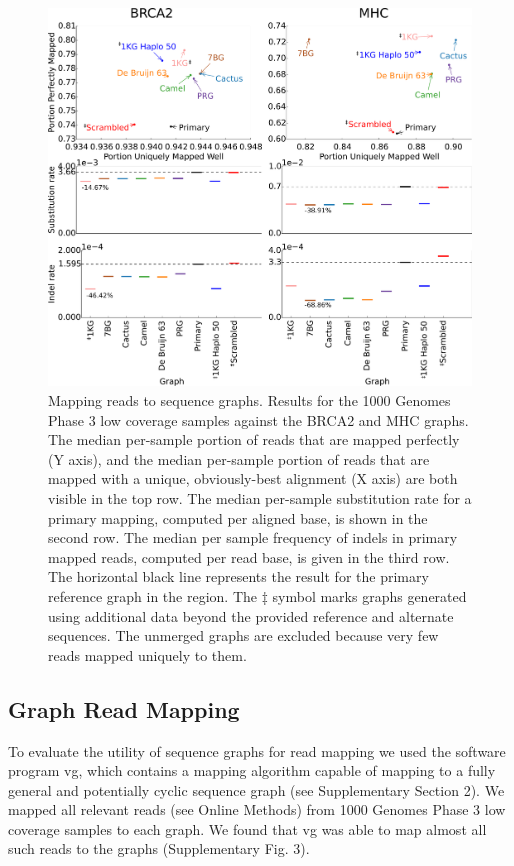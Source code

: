 \begin{figure}[htbp]
\centering
\includegraphics[width=\textwidth]{figures/04_bakeoff/figure02.png}
\caption[Mapping reads to sequence graphs]{Mapping reads to sequence graphs. Results for the 1000 Genomes
Phase 3 low coverage samples against the BRCA2 and MHC graphs. The
median per-sample portion of reads that are mapped perfectly (Y axis),
and the median per-sample portion of reads that are mapped with a
unique, obviously-best alignment (X axis) are both visible in the top
row. The median per-sample substitution rate for a primary mapping,
computed per aligned base, is shown in the second row. The median per
sample frequency of indels in primary mapped reads, computed per read
base, is given in the third row. The horizontal black line represents
the result for the primary reference graph in the region. The ‡ symbol
marks graphs generated using additional data beyond the provided
reference and alternate sequences. The unmerged graphs are excluded
because very few reads mapped uniquely to them.}
\label{fig:bakeoff:mapping}
\end{figure}

\subsection{Graph Read Mapping}

To evaluate the utility of sequence graphs for read mapping we used the
software program vg\cite{Vgteam_undated-xe}, which contains a mapping
algorithm capable of mapping to a fully general and potentially cyclic
sequence graph (see Supplementary Section 2). We mapped all relevant
reads (see Online Methods) from 1000 Genomes Phase 3 low coverage
samples to each graph. We found that vg was able to map almost all such
reads to the graphs (Supplementary Fig. 3).

